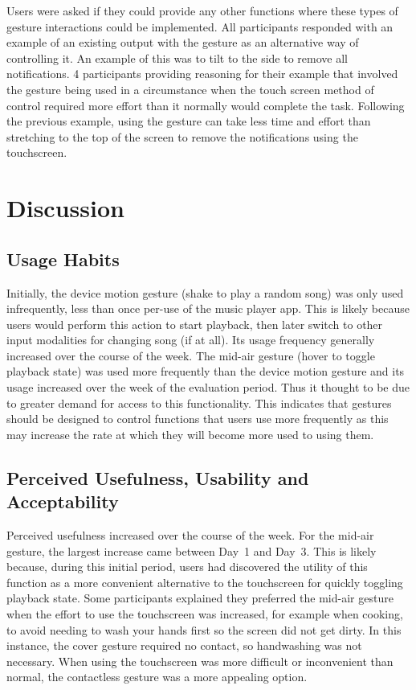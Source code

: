 \documentclass{l4proj}
\begin{document}
Users were asked if they could provide any other functions where these types of gesture interactions could be implemented. All participants responded with an example of an existing output with the gesture as an alternative way of controlling it. An example of this was to tilt to the side to remove all notifications. 4 participants providing reasoning for their example that involved the gesture being used in a circumstance when the touch screen method of control required more effort than it normally would complete the task. Following the previous example, using the gesture can take less time and effort than stretching to the top of the screen to remove the notifications using the touchscreen.


\section{Discussion} 

\subsection{Usage Habits}

Initially, the device motion gesture (shake to play a random song) was only used infrequently, less than once per-use of the music player app. This is likely because users would perform this action to start playback, then later switch to other input modalities for changing song (if at all). Its usage frequency generally increased over the course of the week. The mid-air gesture (hover to toggle playback state) was used more frequently than the device motion gesture and its usage increased over the week of the evaluation period. Thus it thought to be due to greater demand for access to this functionality. This indicates that gestures should be designed to control functions that users use more frequently as this may increase the rate at which they will become more used to using them.

\subsection{Perceived Usefulness, Usability and Acceptability}

Perceived usefulness increased over the course of the week. For the mid-air gesture, the largest increase came between Day~1 and Day~3. This is likely because, during this initial period, users had discovered the utility of this function as a more convenient alternative to the touchscreen for quickly toggling playback state. Some participants explained they preferred the mid-air gesture when the effort to use the touchscreen was increased, for example when cooking, to avoid needing to wash your hands first so the screen did not get dirty. In this instance, the cover gesture required no contact, so handwashing was not necessary. When using the touchscreen was more difficult or inconvenient than normal, the contactless gesture was a more appealing option.
\end{document}

